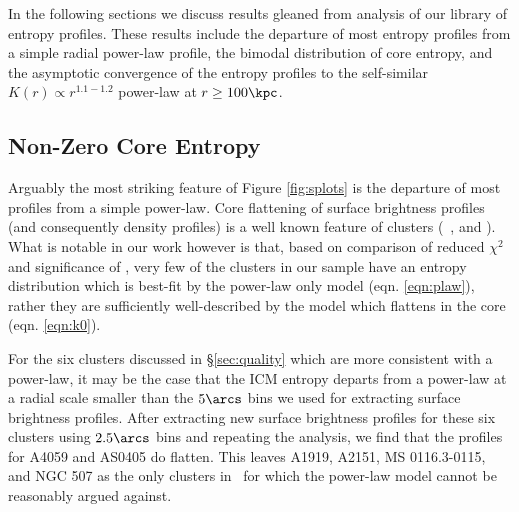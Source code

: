 \documentclass{emulateapj}
\begin{document}
In the following sections we discuss results gleaned from analysis of
our library of entropy profiles. These results include the departure
of most entropy profiles from a simple radial power-law profile, the
bimodal distribution of core entropy, and the asymptotic convergence
of the entropy profiles to the self-similar $K(r) \propto r^{1.1-1.2}$
power-law at $r \geq 100\kpc$.

\subsection{Non-Zero Core Entropy}
\label{sec:nonzerok0}

Arguably the most striking feature of Figure \ref{fig:splots} is the
departure of most profiles from a simple power-law. Core flattening of
surface brightness profiles (and consequently density profiles) is a
well known feature of clusters (\eg\ \citealt{1984ApJ...276...38J},
\citealt{1999ApJ...517..627M} and \citealt{2000MNRAS.318..715X}). What
is notable in our work however is that, based on comparison of reduced
$\chi^2$ and significance of \kna, very few of the clusters in our
sample have an entropy distribution which is best-fit by the power-law
only model (eqn. \ref{eqn:plaw}), rather they are sufficiently
well-described by the model which flattens in the core
(eqn. \ref{eqn:k0}).

For the six clusters discussed in \S\ref{sec:quality} which are more
consistent with a power-law, it may be the case that the ICM entropy
departs from a power-law at a radial scale smaller than the $5\arcs$
bins we used for extracting surface brightness profiles. After
extracting new surface brightness profiles for these six clusters
using $2.5\arcs$ bins and repeating the analysis, we find that the
profiles for A4059 and AS0405 do flatten. This leaves A1919, A2151, MS
0116.3-0115, and NGC 507 as the only clusters in \accept\ for which
the power-law model cannot be reasonably argued against.
\end{document}
